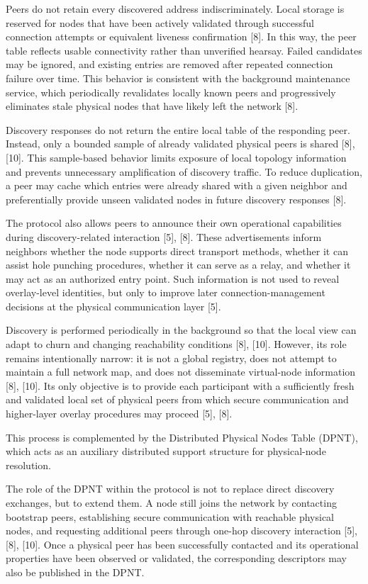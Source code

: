 \documentclass[12pt,a4paper]{article}
\begin{document}
Peers do not retain every discovered address indiscriminately. Local storage is reserved for nodes that have been actively validated through successful connection attempts or equivalent liveness confirmation [8]. In this way, the peer table reflects usable connectivity rather than unverified hearsay. Failed candidates may be ignored, and existing entries are removed after repeated connection failure over time. This behavior is consistent with the background maintenance service, which periodically revalidates locally known peers and progressively eliminates stale physical nodes that have likely left the network [8].

Discovery responses do not return the entire local table of the responding peer. Instead, only a bounded sample of already validated physical peers is shared [8], [10]. This sample-based behavior limits exposure of local topology information and prevents unnecessary amplification of discovery traffic. To reduce duplication, a peer may cache which entries were already shared with a given neighbor and preferentially provide unseen validated nodes in future discovery responses [8].

The protocol also allows peers to announce their own operational capabilities during discovery-related interaction [5], [8]. These advertisements inform neighbors whether the node supports direct transport methods, whether it can assist hole punching procedures, whether it can serve as a relay, and whether it may act as an authorized entry point. Such information is not used to reveal overlay-level identities, but only to improve later connection-management decisions at the physical communication layer [5].

Discovery is performed periodically in the background so that the local view can adapt to churn and changing reachability conditions [8], [10]. However, its role remains intentionally narrow: it is not a global registry, does not attempt to maintain a full network map, and does not disseminate virtual-node information [8], [10]. Its only objective is to provide each participant with a sufficiently fresh and validated local set of physical peers from which secure communication and higher-layer overlay procedures may proceed [5], [8].

This process is complemented by the Distributed Physical Nodes Table (DPNT), which acts as an auxiliary distributed support structure for physical-node resolution.

The role of the DPNT within the protocol is not to replace direct discovery exchanges, but to extend them. A node still joins the network by contacting bootstrap peers, establishing secure communication with reachable physical nodes, and requesting additional peers through one-hop discovery interaction [5], [8], [10]. Once a physical peer has been successfully contacted and its operational properties have been observed or validated, the corresponding descriptors may also be published in the DPNT.
\end{document}
